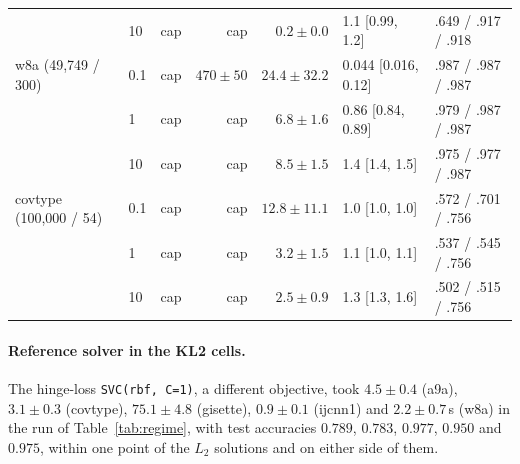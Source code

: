 \documentclass[pdflatex,sn-apa]{sn-jnl}%
\theoremstyle{thmstyleone}
\theoremstyle{thmstyletwo}
\begin{document}
\begin{table}
\begin{tabular}{llrrrll}
 & 10 & cap & cap & $0.2\pm0.0$ & 1.1 [0.99, 1.2] & .649 / .917 / .918 \\
w8a (49,749 / 300) & 0.1 & cap & $470\pm50$ & $24.4\pm32.2$ & 0.044 [0.016, 0.12] & .987 / .987 / .987 \\
 & 1 & cap & cap & $6.8\pm1.6$ & 0.86 [0.84, 0.89] & .979 / .987 / .987 \\
 & 10 & cap & cap & $8.5\pm1.5$ & 1.4 [1.4, 1.5] & .975 / .977 / .987 \\
covtype (100,000 / 54) & 0.1 & cap & cap & $12.8\pm11.1$ & 1.0 [1.0, 1.0] & .572 / .701 / .756 \\
 & 1 & cap & cap & $3.2\pm1.5$ & 1.1 [1.0, 1.1] & .537 / .545 / .756 \\
 & 10 & cap & cap & $2.5\pm0.9$ & 1.3 [1.3, 1.6] & .502 / .515 / .756 \\
\bottomrule
\end{tabular}
\end{table}

\paragraph{Reference solver in the KL2 cells.} The hinge-loss
\texttt{SVC(rbf, C=1)}, a different objective, took $4.5\pm0.4$ (a9a),
$3.1\pm0.3$ (covtype), $75.1\pm4.8$ (gisette), $0.9\pm0.1$ (ijcnn1) and
$2.2\pm0.7$\,s (w8a) in the run of Table~\ref{tab:regime}, with test accuracies $0.789$, $0.783$, $0.977$,
$0.950$ and $0.975$, within one point of the $L_2$ solutions and on
either side of them.
\end{document}
